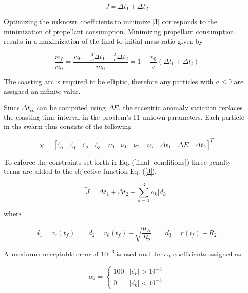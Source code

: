 \begin{equation}
J = \Delta t_1 + \Delta t_2
\label{J}
\end{equation}

\noindent Optimizing the unknown coefficients to minimize \ref{J} corresponds to the minimization of propellant consumption. Minimizing propellant consumption
results in a maximization of the final-to-initial mass ratio given by 

\begin{equation}
\dfrac{m_f}{m_0} = \dfrac{m_0-\frac{T}{c}\Delta t_1-\frac{T}{c}\Delta t_2}{m_0} = 1-\dfrac{n_0}{c}(\Delta t_1 +\Delta t_2)
\label{finalToInitialMassRatio}
\end{equation}

\noindent The coasting arc is required to be elliptic, therefore any particles with $a \leq 0$ are assigned an infinite value. \newline

Since $\Delta t_{co}$ can be computed using $\Delta E$, the eccentric anomaly variation replaces the coasting time interval in the 
problem's 11 unkown parameters. Each particle in the swarm thus consists of the following

\begin{equation}
\chi = [ \zeta_0 \quad \zeta_1 \quad \zeta_2 \quad \zeta_3 \quad \nu_0 \quad \nu_1 \quad \nu_2 \quad \nu_3 \quad \Delta t_1 \quad \Delta E \quad \Delta t_2 ]^T
\label{particleUnkowns}
\end{equation}

To enforce the constraints set forth in Eq. (\ref{final_conditions}) three penalty terms are added to the objective function Eq. (\ref{J}).

\begin{equation}
\tilde{J} = \Delta t_1 + \Delta t_2 + \sum_{k=1}^3 \alpha_k|d_k| 
\label{JwithPenalty}
\end{equation}

\noindent where 

\begin{equation}
d_1 = v_r(t_f) \quad \quad d_2 = v_\theta(t_f) - \sqrt{\dfrac{\mu_B}{R_2}} \quad \quad 
d_3 = r(t_f)-R_2
\label{penaltyValues}
\end{equation}

\noindent A maximum acceptable error of $10^{-3}$ is used and the $\alpha_k$ coefficients assigned as  

\begin{equation}
    \label{penaltyCoefficients}
\alpha_k = \begin{cases}
    100 & |d_k| > 10^{-3} \\
    0 & |d_k| < 10^{-3}
\end{cases}
\end{equation}


